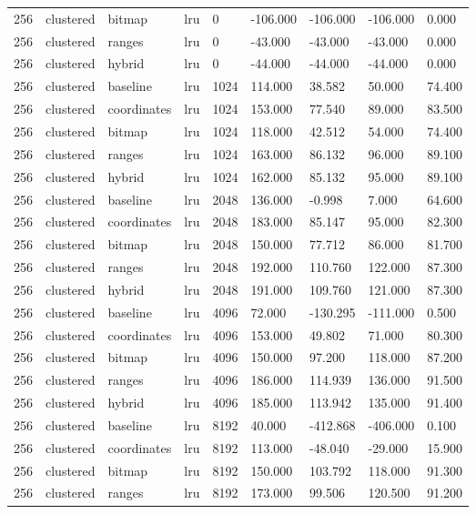 \begin{tabular}{lllllllll}
256 & clustered & bitmap & lru & 0 & -106.000 & -106.000 & -106.000 & 0.000 \\
256 & clustered & ranges & lru & 0 & -43.000 & -43.000 & -43.000 & 0.000 \\
256 & clustered & hybrid & lru & 0 & -44.000 & -44.000 & -44.000 & 0.000 \\
256 & clustered & baseline & lru & 1024 & 114.000 & 38.582 & 50.000 & 74.400 \\
256 & clustered & coordinates & lru & 1024 & 153.000 & 77.540 & 89.000 & 83.500 \\
256 & clustered & bitmap & lru & 1024 & 118.000 & 42.512 & 54.000 & 74.400 \\
256 & clustered & ranges & lru & 1024 & 163.000 & 86.132 & 96.000 & 89.100 \\
256 & clustered & hybrid & lru & 1024 & 162.000 & 85.132 & 95.000 & 89.100 \\
256 & clustered & baseline & lru & 2048 & 136.000 & -0.998 & 7.000 & 64.600 \\
256 & clustered & coordinates & lru & 2048 & 183.000 & 85.147 & 95.000 & 82.300 \\
256 & clustered & bitmap & lru & 2048 & 150.000 & 77.712 & 86.000 & 81.700 \\
256 & clustered & ranges & lru & 2048 & 192.000 & 110.760 & 122.000 & 87.300 \\
256 & clustered & hybrid & lru & 2048 & 191.000 & 109.760 & 121.000 & 87.300 \\
256 & clustered & baseline & lru & 4096 & 72.000 & -130.295 & -111.000 & 0.500 \\
256 & clustered & coordinates & lru & 4096 & 153.000 & 49.802 & 71.000 & 80.300 \\
256 & clustered & bitmap & lru & 4096 & 150.000 & 97.200 & 118.000 & 87.200 \\
256 & clustered & ranges & lru & 4096 & 186.000 & 114.939 & 136.000 & 91.500 \\
256 & clustered & hybrid & lru & 4096 & 185.000 & 113.942 & 135.000 & 91.400 \\
256 & clustered & baseline & lru & 8192 & 40.000 & -412.868 & -406.000 & 0.100 \\
256 & clustered & coordinates & lru & 8192 & 113.000 & -48.040 & -29.000 & 15.900 \\
256 & clustered & bitmap & lru & 8192 & 150.000 & 103.792 & 118.000 & 91.300 \\
256 & clustered & ranges & lru & 8192 & 173.000 & 99.506 & 120.500 & 91.200 \\

\end{tabular}
